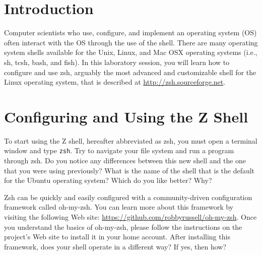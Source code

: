 

\usepackage[compact]{titlesec}



\section*{Introduction}


Computer scientists who use, configure, and implement an operating system (OS) often interact with the OS through the use of
the shell.  There are many operating system shells available for the Unix, Linux, and Mac OSX operating systems (i.e., sh, tcsh, bash,
and fish).  In this laboratory session, you will learn how to configure and use zsh, arguably the most advanced and customizable
shell for the Linux operating system, that is described at \url{http://zsh.sourceforge.net}.

\section*{Configuring and Using the Z Shell}

To start using the Z shell, hereafter abbreviated as zsh, you must open a terminal window and type {\tt zsh}.  Try to navigate
your file system and run a program through zsh.  Do you notice any differences between this new shell and the one that you were
using previously?  What is the name of the shell that is the default for the Ubuntu operating system? Which do you like better?
Why?

Zsh can be quickly and easily configured with a community-driven configuration framework called oh-my-zsh.  You can learn more
about this framework by visiting the following Web site: \url{https://github.com/robbyrussell/oh-my-zsh}. Once you understand the
basics of oh-my-zsh, please follow the instructions on the project's Web site to install it in your home account. After installing
this framework, does your shell operate in a different way? If yes, then how?

